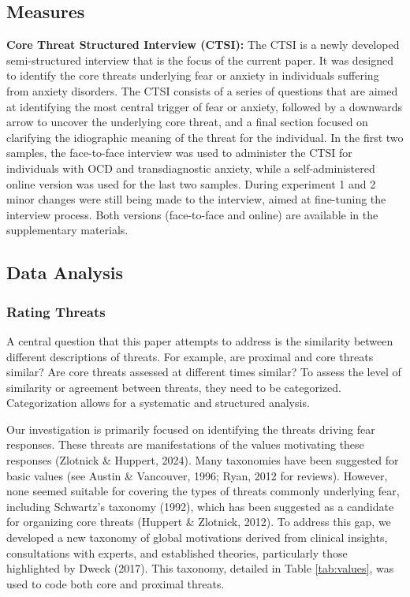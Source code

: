 \documentclass[
  man,floatsintext]{apa7}
\begin{document}
\subsection{Measures}\label{measures}

\textbf{Core Threat Structured Interview (CTSI):} The CTSI is a newly developed semi-structured interview that is the focus of the current paper.
It was designed to identify the core threats underlying fear or anxiety in individuals suffering from anxiety disorders.
The CTSI consists of a series of questions that are aimed at identifying the most central trigger of fear or anxiety, followed by a downwards arrow to uncover the underlying core threat, and a final section focused on clarifying the idiographic meaning of the threat for the individual.
In the first two samples, the face-to-face interview was used to administer the CTSI for individuals with OCD and transdiagnostic anxiety, while a self-administered online version was used for the last two samples.
During experiment 1 and 2 minor changes were still being made to the interview, aimed at fine-tuning the interview process.
Both versions (face-to-face and online) are available in the supplementary materials.

\subsection{Data Analysis}\label{data-analysis}

\subsubsection{Rating Threats}\label{rating-threats}

A central question that this paper attempts to address is the similarity between different descriptions of threats.
For example, are proximal and core threats similar? Are core threats assessed at different times similar?
To assess the level of similarity or agreement between threats, they need to be categorized.
Categorization allows for a systematic and structured analysis.

Our investigation is primarily focused on identifying the threats driving fear responses.
These threats are manifestations of the values motivating these responses (Zlotnick \& Huppert, 2024).
Many taxonomies have been suggested for basic values (see Austin \& Vancouver, 1996; Ryan, 2012 for reviews).
However, none seemed suitable for covering the types of threats commonly underlying fear, including Schwartz's taxonomy (1992), which has been suggested as a candidate for organizing core threats (Huppert \& Zlotnick, 2012).
To address this gap, we developed a new taxonomy of global motivations derived from clinical insights, consultations with experts, and established theories, particularly those highlighted by Dweck (2017).
This taxonomy, detailed in Table \ref{tab:values}, was used to code both core and proximal threats.
\end{document}
